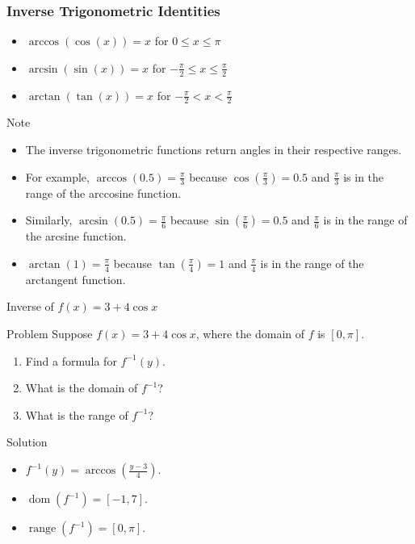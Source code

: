 \documentclass{beamer}
\begin{document}
\begin{frame}
    \frametitle{Inverse Trigonometric Identities}
    \begin{itemize}
        \item \(\arccos(\cos(x)) = x\) for \(0 \leq x \leq \pi\)
        \item \(\arcsin(\sin(x)) = x\) for \(-\frac{\pi}{2} \leq x \leq \frac{\pi}{2}\)
        \item \(\arctan(\tan(x)) = x\) for \(-\frac{\pi}{2} < x < \frac{\pi}{2}\)
    \end{itemize}
    \begin{block}{Note}
        \begin{itemize}
            \item The inverse trigonometric functions return angles in their respective ranges.
            \item For example, \(\arccos(0.5) = \frac{\pi}{3}\) because \(\cos(\frac{\pi}{3}) = 0.5\) and \(\frac{\pi}{3}\) is in the range of the arccosine function.
            \item Similarly, \(\arcsin(0.5) = \frac{\pi}{6}\) because \(\sin(\frac{\pi}{6}) = 0.5\) and \(\frac{\pi}{6}\) is in the range of the arcsine function.
            \item \(\arctan(1) = \frac{\pi}{4}\) because \(\tan(\frac{\pi}{4}) = 1\) and \(\frac{\pi}{4}\) is in the range of the arctangent function.
        \end{itemize}
    \end{block} 
\end{frame}


\begin{frame}{Inverse of $f(x)=3+4\cos x$}
  \begin{block}{Problem}
    Suppose $f(x)=3+4\cos x$, where the domain of $f$ is $[0,\pi]$.
    \begin{enumerate}[]
      \item Find a formula for $f^{-1}(y)$.
      \item What is the domain of $f^{-1}$?
      \item What is the range of $f^{-1}$?
    \end{enumerate}
  \end{block}
  \begin{block}{Solution}
    \begin{itemize}
      \item $f^{-1}(y)=\arccos\left(\frac{y-3}{4}\right)$.
      \item $\operatorname{dom}(f^{-1})=[-1,7]$.
      \item $\operatorname{range}(f^{-1})=[0,\pi]$.
    \end{itemize}
  \end{block}
\end{frame}
\end{document}
